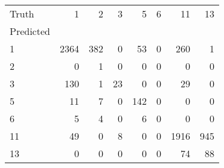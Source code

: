 \begin{tabular}{lrrrrrrr}
\toprule
Truth & 1 & 2 & 3 & 5 & 6 & 11 & 13 \\
Predicted &  &  &  &  &  &  &  \\
\midrule
1 & 2364 & 382 & 0 & 53 & 0 & 260 & 1 \\
2 & 0 & 1 & 0 & 0 & 0 & 0 & 0 \\
3 & 130 & 1 & 23 & 0 & 0 & 29 & 0 \\
5 & 11 & 7 & 0 & 142 & 0 & 0 & 0 \\
6 & 5 & 4 & 0 & 6 & 0 & 0 & 0 \\
11 & 49 & 0 & 8 & 0 & 0 & 1916 & 945 \\
13 & 0 & 0 & 0 & 0 & 0 & 74 & 88 \\
\bottomrule
\end{tabular}
